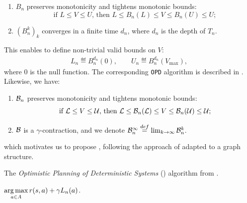 \documentclass[runningheads]{llncs}
\begin{document}
\begin{lemma}[Properties of $B_n$]
	\label{lem:properties-b-tree}
	\begin{enumerate}[label=(\roman*)]
		\item $B_n$ preserves monotonicity and tightens monotonic bounds: $$
		\text{if } L\leq V\leq U \text{, then } L \leq B_n(L) \leq V \leq B_n(U) \leq U;
		$$
		\item $(B_n^k)_k$ converges in a finite time $d_n$, where $d_n$ is the depth of $T_n$. 
	\end{enumerate}
\end{lemma}
This enables \citet{Hren2008optimistic} to define non-trivial valid bounds on $V$:
\begin{align}
\label{eq:opd-bounds}
L_n \eqdef B_n^{d_n}(0), \qquad U_n \eqdef B_n^{d_n}(V_{\max}),
\end{align}
where $0$ is the null function.
The corresponding \texttt{OPD} algorithm is described in . Likewise, we have:
\begin{lemma}[Properties of $\cB_n$]
	\label{lem:properties-b-graph}
	\begin{enumerate}[label=(\roman*)]
		\item $\cB_n$ preserves monotonicity and tightens monotonic bounds: $$
		\text{if } \mathcal{L}\leq V\leq \mathcal{U} \text{, then } \mathcal{L} \leq \mathcal{B}_n(\mathcal{L}) \leq V \leq \mathcal{B}_n(\mathcal{U}) \leq \mathcal{U};
		$$
		\item $\mathcal{B}$ is a $\gamma$-contraction, and we denote $\mathcal{B}_n^{\infty} \stackrel{def}{=} \lim_{k\rightarrow \infty} \mathcal{B}_n^k$.
	\end{enumerate}
\end{lemma}
which motivates us to propose , following the approach of  adapted to a graph structure.

\begin{algorithm}[th]
	\caption{The \emph{Optimistic Planning of Deterministic Systems} (\OPD) algorithm from \citep{Hren2008optimistic}.}
	\label{alg:opd}
	\DontPrintSemicolon
	\Return $\displaystyle\operatorname*{arg\,max}_{a\in A} r(s, a) + \gamma L_n(a)$. \;
\end{algorithm}
\end{document}
